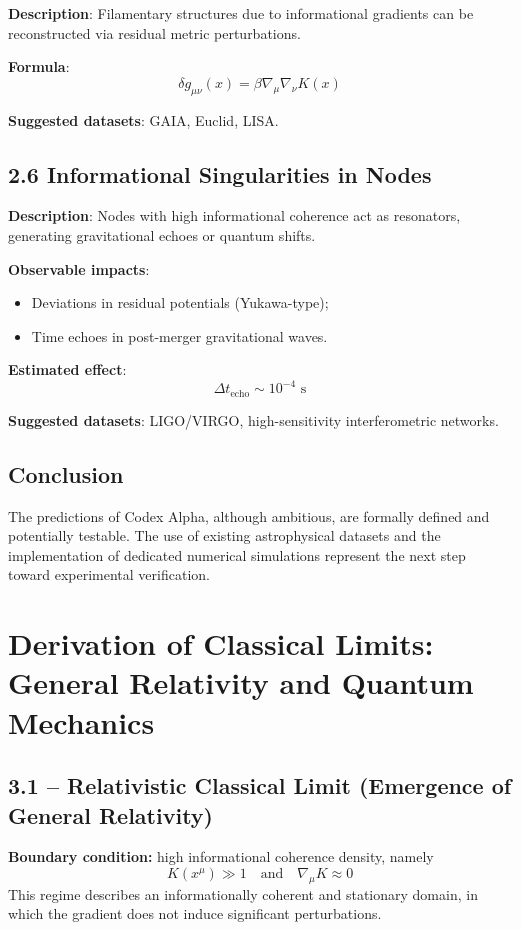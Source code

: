 \documentclass[12pt]{article}
\begin{document}
\textbf{Description}: Filamentary structures due to informational gradients can be reconstructed via residual metric perturbations.

\textbf{Formula}:
\[
\delta g_{\mu\nu}(x) = \beta \nabla_\mu \nabla_\nu K(x)
\]

\textbf{Suggested datasets}: GAIA, Euclid, LISA.

\subsection*{2.6 Informational Singularities in Nodes}

\textbf{Description}: Nodes with high informational coherence act as resonators, generating gravitational echoes or quantum shifts.

\textbf{Observable impacts}:
\begin{itemize}
    \item Deviations in residual potentials (Yukawa-type);
    \item Time echoes in post-merger gravitational waves.
\end{itemize}

\textbf{Estimated effect}:
\[
\Delta t_{\text{echo}} \sim 10^{-4} \text{ s}
\]

\textbf{Suggested datasets}: LIGO/VIRGO, high-sensitivity interferometric networks.

\subsection*{Conclusion}

The predictions of Codex Alpha, although ambitious, are formally defined and potentially testable. The use of existing astrophysical datasets and the implementation of dedicated numerical simulations represent the next step toward experimental verification.

\section*{Derivation of Classical Limits: General Relativity and Quantum Mechanics}

\subsection*{3.1 – Relativistic Classical Limit (Emergence of General Relativity)}

\textbf{Boundary condition:} high informational coherence density, namely
\[
K(x^\mu) \gg 1 \quad \text{and} \quad \nabla_\mu K \approx 0
\]
This regime describes an informationally coherent and stationary domain, in which the gradient does not induce significant perturbations.
\end{document}
